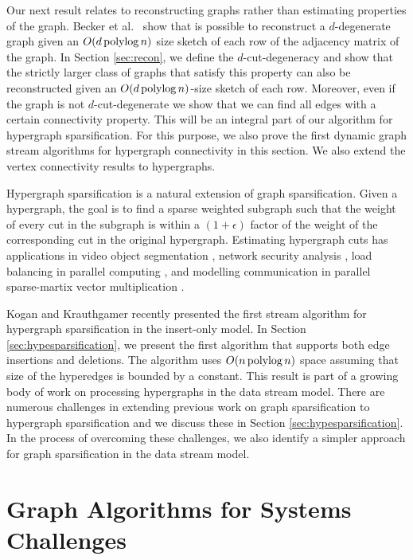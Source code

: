  Our next result relates to reconstructing graphs rather than estimating properties of the graph. Becker et al.~\cite{BeckerMNRST11} show that is possible to reconstruct a $d$-degenerate graph given an $O(d \operatorname{polylog} n)$ size sketch of each row of the adjacency matrix of the graph. In Section \ref{sec:recon}, we define the  $d$-cut-degeneracy and show that the strictly larger class of graphs that satisfy this property can also be reconstructed given an $O(d \operatorname{polylog} n)$-size sketch of each row. Moreover, even if the graph is not $d$-cut-degenerate we show that we can find all edges with a certain connectivity property. This will be an integral part of our algorithm for hypergraph sparsification. For this purpose, we also prove the first dynamic graph stream algorithms for hypergraph connectivity in this section. We also extend the vertex connectivity results to hypergraphs.


Hypergraph sparsification is a natural extension of graph sparsification. Given a hypergraph, the goal is to find a sparse weighted subgraph such that the weight of every cut in the subgraph is within a $(1+\epsilon)$ factor of the weight of the corresponding cut in the original hypergraph. 
Estimating hypergraph cuts has applications in video object segmentation \cite{HuangLM09}, network security analysis \cite{Yamaguchi14},  load balancing in parallel computing \cite{CatalyurekBDBHR09}, and
modelling communication in parallel sparse-martix vector multiplication 
\cite{CatalyurekA99}.

Kogan and Krauthgamer \cite{KoganK14} recently presented the first stream algorithm for hypergraph sparsification in the insert-only model. In Section \ref{sec:hypesparsification}, we present the first algorithm that supports both edge insertions and deletions. The algorithm uses $O(n\operatorname{polylog} n)$ space assuming that size of the hyperedges is bounded by a  constant. This result is part of a growing body of work on processing hypergraphs in the data stream model\cite{SahaG09,EmekR14,RadhakrishnanS11,Sun13,KoganK14}. There are numerous challenges in extending previous work on graph sparsification \cite{AhnGM12b,AhnGM13,KapralovLMMS14,KapralovW14,GoelKP12} to hypergraph sparsification and we discuss these in Section \ref{sec:hypesparsification}. In the process of overcoming these challenges, we also identify a simpler approach for graph sparsification in the data stream model.
 
\section{Graph Algorithms for Systems Challenges}

